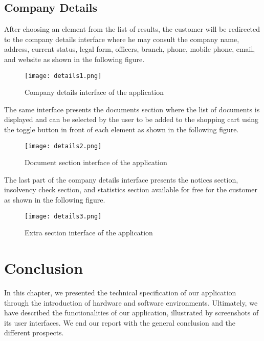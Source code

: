 \subsection{Company Details}
After choosing an element from the list of results, the customer will be redirected to the company details interface where he may consult the company name, address, current status, legal form, officers, branch, phone, mobile phone, email, and website as shown in the following figure.
 \begin{figure}[H]%
    \center   
    
    \texttt{[image: details1.png]}
    \caption{Company details interface of the application}
\end{figure}
The same interface presents the documents section where the list of documents is displayed and can be selected by the user to be added to the shopping cart using the toggle button in front of each element as shown in the following figure.
\begin{figure}[H]%
    \center   
    
    \texttt{[image: details2.png]}
    \caption{Document section interface of the application}
\end{figure}
The last part of the company details interface presents the notices section, insolvency check section, and statistics section available for free for the customer as shown in the following figure.
\begin{figure}[H]%
    \center   
    
    \texttt{[image: details3.png]}
    \caption{Extra section interface of the application}
\end{figure}
\section*{Conclusion}
In this chapter, we presented the technical specification of our
application through the introduction of hardware and software environments. Ultimately,
we have described the functionalities of our application,
illustrated by screenshots of its user interfaces.
We end our report with the general conclusion and the different
prospects.